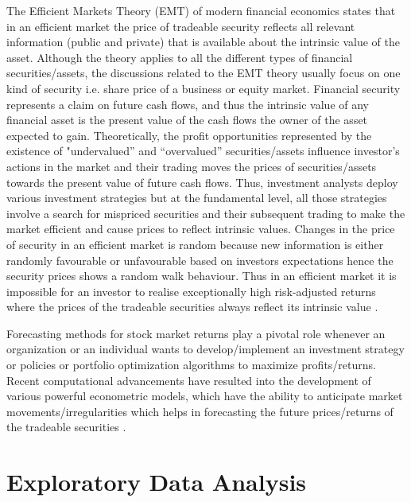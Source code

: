 \documentclass[conference]{IEEEtran}
\begin{document}
The Efficient Markets Theory (EMT) of modern financial economics states that in an efficient market the price of tradeable security reflects all relevant information (public and private) that is available about the intrinsic value of the asset. Although the theory applies to all the different types of financial securities/assets, the discussions related to the EMT theory usually focus on one kind of security i.e. share price of a business or equity market. Financial security represents a claim on future cash flows, and thus the intrinsic value of any financial asset is the present value of the cash flows the owner of the asset expected to gain.
Theoretically, the profit opportunities represented by the existence of "undervalued” and “overvalued” securities/assets influence investor's actions in the market and their trading moves the prices of securities/assets towards the present value of future cash flows. Thus, investment analysts deploy various investment strategies but at the fundamental level, all those strategies involve a search for mispriced securities and their subsequent trading to make the market efficient and cause prices to reflect intrinsic values. Changes in the price of security in an efficient market is random because new information is either randomly favourable or unfavourable based on investors expectations hence the security prices shows a random walk behaviour. Thus in an efficient market it is impossible for an investor to realise exceptionally high risk-adjusted returns where the prices of the tradeable securities always reflect its intrinsic value \cite{b1}.

Forecasting methods for stock market returns play a pivotal role whenever an organization or an individual wants to develop/implement an investment strategy or policies or portfolio optimization algorithms to maximize profits/returns. Recent computational advancements have resulted into the development of various powerful econometric models, which have the ability to anticipate market movements/irregularities which helps in forecasting the future prices/returns of the tradeable securities \cite{b2}.

\section{Exploratory Data Analysis}
\end{document}
